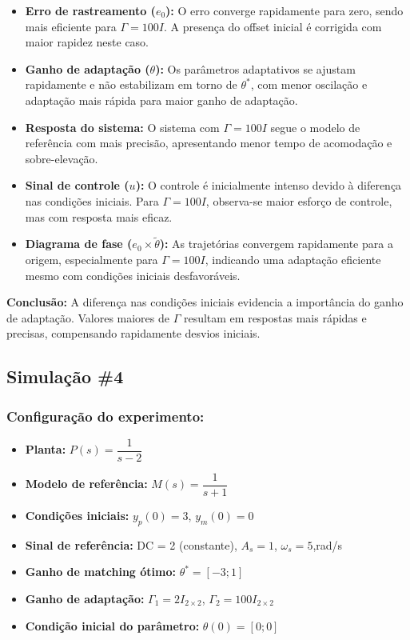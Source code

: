 \documentclass[10pt]{article}
\begin{document}
\begin{itemize}
    \item \textbf{Erro de rastreamento ($e_0$):} O erro converge rapidamente para zero, sendo mais eficiente para $\Gamma = 100I$. A presença do offset inicial é corrigida com maior rapidez neste caso.

    \item \textbf{Ganho de adaptação ($\theta$):} Os parâmetros adaptativos se ajustam rapidamente e não estabilizam em torno de $\theta^*$, com menor oscilação e adaptação mais rápida para maior ganho de adaptação.

    \item \textbf{Resposta do sistema:} O sistema com $\Gamma = 100I$ segue o modelo de referência com mais precisão, apresentando menor tempo de acomodação e sobre-elevação.

    \item \textbf{Sinal de controle ($u$):} O controle é inicialmente intenso devido à diferença nas condições iniciais. Para $\Gamma = 100I$, observa-se maior esforço de controle, mas com resposta mais eficaz.

    \item \textbf{Diagrama de fase ($e_0 \times \tilde{\theta}$):} As trajetórias convergem rapidamente para a origem, especialmente para $\Gamma = 100I$, indicando uma adaptação eficiente mesmo com condições iniciais desfavoráveis.

\end{itemize}

\textbf{Conclusão:} A diferença nas condições iniciais evidencia a importância do ganho de adaptação. Valores maiores de $\Gamma$ resultam em respostas mais rápidas e precisas, compensando rapidamente desvios iniciais.

\newpage

\subsection{Simulação \#4}
\subsubsection{Configuração do experimento:}
\begin{itemize}
\item \textbf{Planta:} $P(s) = \dfrac{1}{s - 2}$
\item \textbf{Modelo de referência:} $M(s) = \dfrac{1}{s + 1}$
\item \textbf{Condições iniciais:} $y_p(0)=3$, $y_m(0)=0$
\item \textbf{Sinal de referência:} DC = 2 (constante), $A_s=1$, $\omega_s=5$,rad/s
\item \textbf{Ganho de matching ótimo:} $\theta^* = [-3;1]$
\item \textbf{Ganho de adaptação:} $\Gamma_1 = 2I_{2\times2}$, $\Gamma_2 = 100 I_{2\times2}$
\item \textbf{Condição inicial do parâmetro:} $\theta(0) = [0;0]$
\end{itemize}
\end{document}
